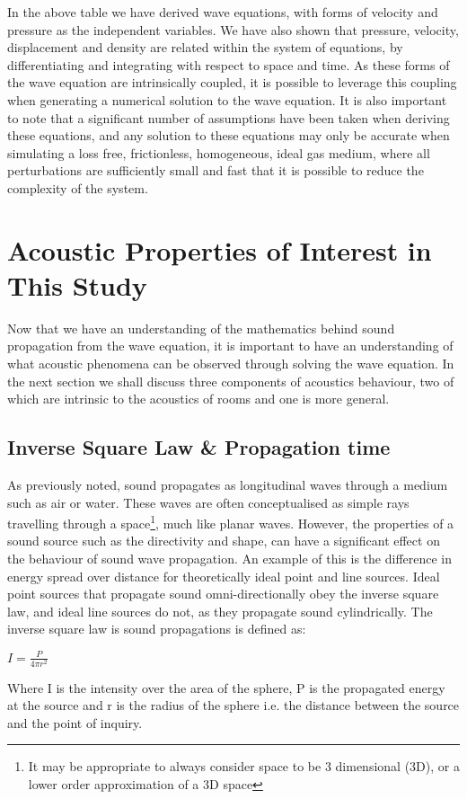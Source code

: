 In the above table we have derived wave equations, with forms of velocity and pressure as the independent variables. We have also shown that pressure, velocity, displacement and density are related within the system of equations, by differentiating and integrating with respect to space and time. As these forms of the wave equation are intrinsically coupled, it is possible to leverage this coupling when generating a numerical solution to the wave equation. It is also important to note that a significant number of assumptions have been taken when deriving these equations, and any solution to these equations may only be accurate when simulating a loss free, frictionless, homogeneous, ideal gas medium, where all perturbations are sufficiently small and fast that it is possible to reduce the complexity of the system.\\

\section{Acoustic Properties of Interest in This Study}
Now that we have an understanding of the mathematics behind sound propagation from the wave equation, it is important to have an understanding of what acoustic phenomena can be observed through solving the wave equation. In the next section we shall discuss three components of acoustics behaviour, two of which are intrinsic to the acoustics of rooms and one is more general.\\

\subsection{Inverse Square Law \& Propagation time}
As previously noted, sound propagates as longitudinal waves through a medium such as air or water. These waves are often conceptualised as simple rays travelling through a space\footnote{It may be appropriate to always consider space to be 3 dimensional (3D), or a lower order approximation of a 3D space}, much like planar waves. However, the properties of a sound source such as the directivity and shape, can have a significant effect on the behaviour of sound wave propagation. An example of this is the difference in energy spread over distance for theoretically ideal point and line sources. Ideal point sources that propagate sound omni-directionally obey the inverse square law, and ideal line sources do not, as they propagate sound cylindrically. The inverse square law is sound propagations is defined as:\\
\begin{center}
$I = \frac{P}{4 \pi r^2}$\\
\end{center}
Where I is the intensity over the area of the sphere, P is the propagated energy at the source and r is the radius of the sphere i.e. the distance between the source and the point of inquiry.\\



